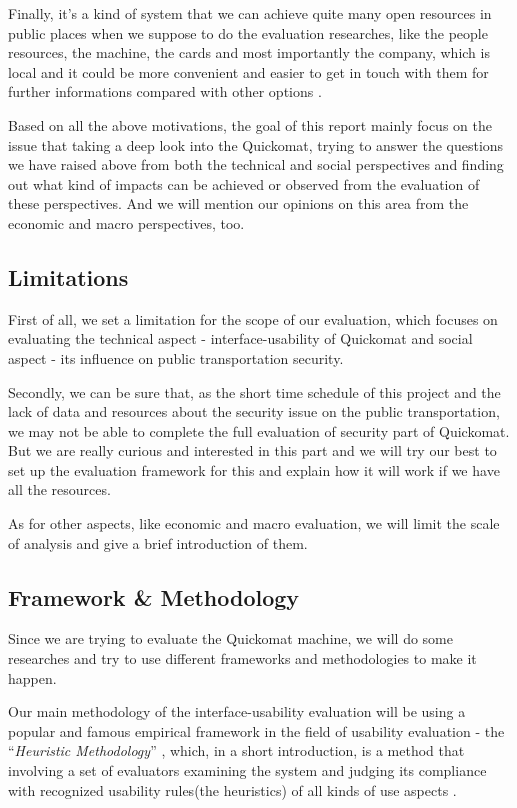 \documentclass[twocolumn]{article}
\begin{document}
Finally, it’s a kind of system that we can achieve quite many open resources in public places when we suppose to do the evaluation researches, like the people resources, the machine, the cards and most importantly the company, which is local and it could be more convenient and easier to get in touch with them for further informations compared with other options \citep{QuickomatAB2014}.

Based on all the above motivations, the goal of this report mainly focus on the issue that taking a deep look into the Quickomat, trying to answer the questions we have raised above from both the technical and social perspectives and finding out what kind of impacts can be achieved or observed from the evaluation of these perspectives. And we will mention our opinions on this area from the economic and macro perspectives, too.

\subsection{Limitations}
\label{sec:introduction-limitations}
First of all, we set a limitation for the scope of our evaluation, which focuses on evaluating the technical aspect - interface-usability of Quickomat and social aspect - its influence on public transportation security. 

Secondly, we can be sure that, as the short time schedule of this project and the lack of data and resources about the security issue on the public transportation, we may not be able to complete the full evaluation of security part of Quickomat. But we are really curious and interested in this part and we will try our best to set up the evaluation framework for this and explain how it will work if we have all the resources. 

As for other aspects, like economic and  macro evaluation, we will limit the scale of analysis and give a brief introduction of them.

\subsection{Framework \& Methodology}
Since we are trying to evaluate the Quickomat machine, we will do some researches and try to use different frameworks and methodologies to make it happen.

Our main methodology of the interface-usability evaluation will be using a popular and famous empirical framework in the field of usability evaluation - the “\emph{Heuristic Methodology}” \citep{Nielsen:1990:HEU:97243.97281, Nielsen1994}, which, in a short introduction, is a method that involving a set of evaluators examining the system and judging its compliance with recognized usability rules(the heuristics) of all kinds of use aspects \citep{Zhang1996}. 
\end{document}
